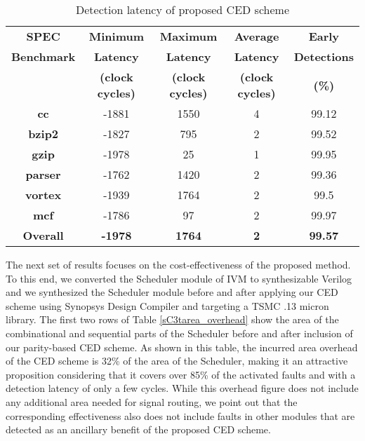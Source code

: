 \documentclass[12pt]{yalephd}
\newcommand{\snp}[1] {\noindent {\underline {#1}}}
\begin{document}
\begin{table}[t]
\caption{Detection latency of proposed CED scheme}\label{sC3tlatencyresults}
\begin{center}
\begin{tabular}{||c|c|c|c|c||}
\hline
\hline
{\bf SPEC} & {\bf Minimum} & {\bf Maximum} & {\bf Average} & {\bf Early}\\
{\bf Benchmark} & {\bf Latency} & {\bf Latency} & {\bf Latency} & {\bf Detections}\\
{} & {\bf (clock cycles)} & {\bf (clock cycles)} & {\bf (clock cycles)} & {\bf (\%)}\\
\hline
{\bf cc}  & -1881 & 1550 & 4 & 99.12\\
\hline
{\bf bzip2}  & -1827 & 795 & 2 & 99.52\\
\hline
{\bf gzip} & -1978 & 25 & 1 & 99.95\\
\hline
{\bf parser} &  -1762 & 1420 & 2 & 99.36\\	
\hline
{\bf vortex} & -1939 & 1764 & 2 & 99.5\\
\hline
{\bf mcf} & -1786 & 97 & 2 & 99.97\\
\hline
{\bf Overall} & {\bf -1978} & {\bf 1764} & {\bf 2} & {\bf 99.57}\\
\hline
\hline
\end{tabular}
\end{center}
\end{table}

\snp{Incurred area overhead:} The next set of results focuses on the cost-effectiveness of the proposed method. To this end, we converted the Scheduler module of IVM to synthesizable Verilog and we synthesized the Scheduler module before and after applying our CED scheme using Synopsys Design Compiler and targeting a TSMC .13 micron library. The first two rows of Table \ref{sC3tarea_overhead} show the area of the combinational and sequential parts of the Scheduler before and after inclusion of our parity-based CED scheme. As shown in this table, the incurred area overhead of the CED scheme is 32\% of the area of the Scheduler, making it an attractive proposition considering that it covers over 85\% of the activated faults and with a detection latency of only a few cycles. While this overhead figure does not include any additional area needed for signal routing, we point out that the corresponding effectiveness also does not include faults in other modules that are detected as an ancillary benefit of the proposed CED scheme.
\end{document}
